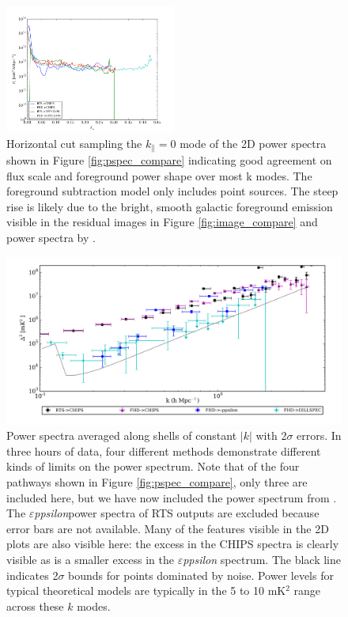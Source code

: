 \documentclass[twolcolumn,iop]{emulateapj}
\def\eppsilon{{\it $\varepsilon$ppsilon}}
\def\dilloncite{\cite{PhysRevD.91.123011} }
\begin{document}
\begin{figure}[htbp]
\begin{center}
\includegraphics[width=0.5\textwidth]{figures/MWAPipeline_compare_1d_kperp.png}
\caption{Horizontal cut sampling the $k_\parallel = 0$ mode of the 2D power spectra shown in Figure \ref{fig:pspec_compare} indicating good agreement on flux scale and foreground power shape over most k modes. The foreground subtraction model only includes point sources. The steep rise is likely due to the bright, smooth galactic foreground emission visible in the residual images in Figure \ref{fig:image_compare} and power spectra by \cite{2015ApJ...807L..28T}.}
\label{fig:1d_kperp}
\end{center}
\end{figure}


\begin{figure}[htbp]

\includegraphics[width=\textwidth]{figures/MWA_PS_Compare/MWAPipeline_compare_1d_radial_logbryna.png}
\caption{Power spectra averaged along shells of constant $|k|$ with 2$\sigma$ errors. In three hours of data, four different methods demonstrate different kinds of limits on the power spectrum. Note that of the four pathways shown in Figure \ref{fig:pspec_compare}, only three are included here, but we have now included the power spectrum from \dilloncite{}. The \eppsilon power spectra of RTS outputs are excluded because error bars are not available. Many of the features visible in the 2D plots are also visible here: the excess in the CHIPS spectra is clearly visible as is a smaller excess in the \eppsilon{} spectrum.  The black line indicates 2$\sigma$ bounds for points dominated by noise.  Power levels for typical theoretical models are typically in the 5 to 10 mK$^2$ range across these $k$ modes.
\label{fig:1D_pspecs}}

\end{figure}
\end{document}
